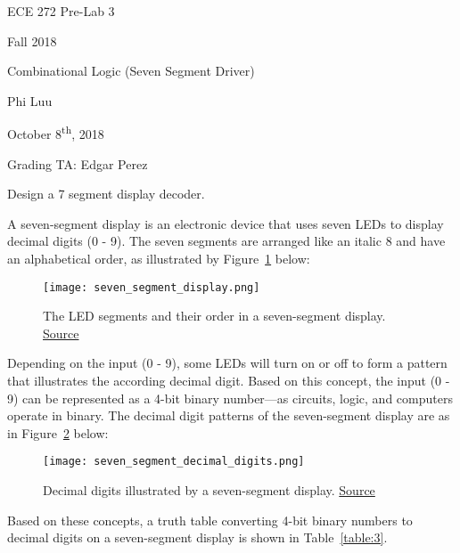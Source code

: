 \documentclass[12pt]{article}
\begin{document}
\begin{titlepage}
  \begin{center} \LARGE
    \vspace*{1.5in}

    ECE 272 Pre-Lab 3

    Fall 2018

    \vfill

    Combinational Logic (Seven Segment Driver)

    Phi Luu

    \vfill

    October 8\textsuperscript{th}, 2018

    Grading TA: Edgar Perez

    \vspace{1.5in}
  \end{center}
\end{titlepage}

{\Large Design a 7 segment display decoder.}

\rule{0em}{1.5em}

A seven-segment display is an electronic device that uses seven LEDs to display decimal digits (0 - 9). The seven segments are arranged like an italic 8 and have an alphabetical order, as illustrated by Figure~\ref{figure:1} below:

\begin{figure}[h]
  \centering
  \texttt{[image: seven\_segment\_display.png]}
  \caption{The LED segments and their order in a seven-segment display. \href{https://commons.wikimedia.org/wiki/Seven_segment_display}{Source}}
  \label{figure:1}
\end{figure}

Depending on the input (0 - 9), some LEDs will turn on or off to form a pattern that illustrates the according decimal digit. Based on this concept, the input (0 - 9) can be represented as a 4-bit binary number---as circuits, logic, and computers operate in binary. The decimal digit patterns of the seven-segment display are as in Figure~\ref{figure:2} below:

\begin{figure}[h]
  \centering
  \texttt{[image: seven\_segment\_decimal\_digits.png]}
  \caption{Decimal digits illustrated by a seven-segment display. \href{https://commons.wikimedia.org/wiki/Seven_segment_display}{Source}}
  \label{figure:2}
\end{figure}

Based on these concepts, a truth table converting 4-bit binary numbers to decimal digits on a seven-segment display is shown in Table~\ref{table:3}.
\end{document}
